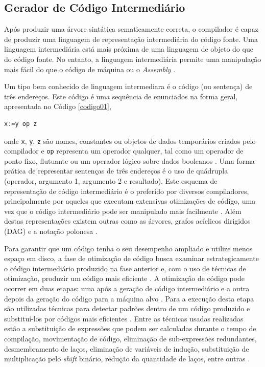 \subsection{Gerador de Código Intermediário}

Após produzir uma árvore sintática sematicamente correta, o compilador é capaz de
 produzir uma linguagem de representação intermediária do código fonte. Uma linguagem 
intermediária está mais próxima de uma linguagem de objeto do que do código fonte. 
No entanto, a linguagem  intermediária permite uma manipulação mais fácil do que o 
código de máquina ou o \textit{Assembly} \cite{ref25}. 

Um tipo bem conhecido de linguagem intermediara é o código (ou sentença) de três 
endereços\cite{ref26}. Este código é uma sequência de enunciados na forma geral, apresentada 
 no Código \ref{codigo01},

\begin{lstlisting}[language=C++,caption={Código de três endereços},
											label=codigo01]
   x:=y op z
\end{lstlisting}
onde \texttt{x}, \texttt{y}, \texttt{z} são nomes, constantes ou objetos de dados 
temporários criados pelo compilador e \texttt{op} representa um operador qualquer,
 tal como um operador de ponto fixo, flutuante ou um operador lógico sobre dados
 booleanos \cite{ref27}. Uma forma prática de representar sentenças de três endereços é o uso
 de quádrupla (operador, argumento 1, argumento 2 e resultado). 
Este esquema de representação de código intermediário é o preferido por diversos
 compiladores, principalmente por aqueles que executam extensivas otimizações de
 código, uma vez que o código intermediário pode ser manipulado mais 
facilmente \cite{ref28}. Além destas representações existem outras como as 
árvores, grafos acíclicos dirigidos (DAG) e a notação polonesa \cite{ref29}.

Para garantir que um código tenha o seu desempenho ampliado e utilize menos 
espaço em disco, a fase de otimização de código busca examinar 
estrategicamente o código intermediário produzido na fase anterior e, com o 
uso de técnicas de otimização, produzir um código mais eficiente \cite{ref30}
. A otimização de código pode ocorrer em duas etapas: uma após a geração de 
código intermediário e a outra depois da geração do código para a máquina 
alvo \cite{ref31}. 
Para a execução desta etapa são utilizadas técnicas para detectar 
padrões dentro de um código produzido e substituí-los por códigos mais
 eficientes \cite{ref28}. Entre as técnicas usadas realizadas estão a 
substituição de expressões que podem ser calculadas durante o tempo 
de compilação, movimentação de código, eliminação de sub-expressões 
redundantes, desmembramento de laços, eliminação de variáveis de indução, 
substituição de multiplicação pelo \textit{shift} binário, redução da 
quantidade de laços, entre outras \cite{ref30}.

